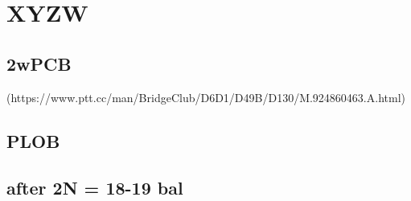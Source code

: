 \section{XYZW}

\subsection{2wPCB}

(https://www.ptt.cc/man/BridgeClub/D6D1/D49B/D130/M.924860463.A.html)


\subsection{PLOB}


\subsection{after 2N = 18-19 bal}

